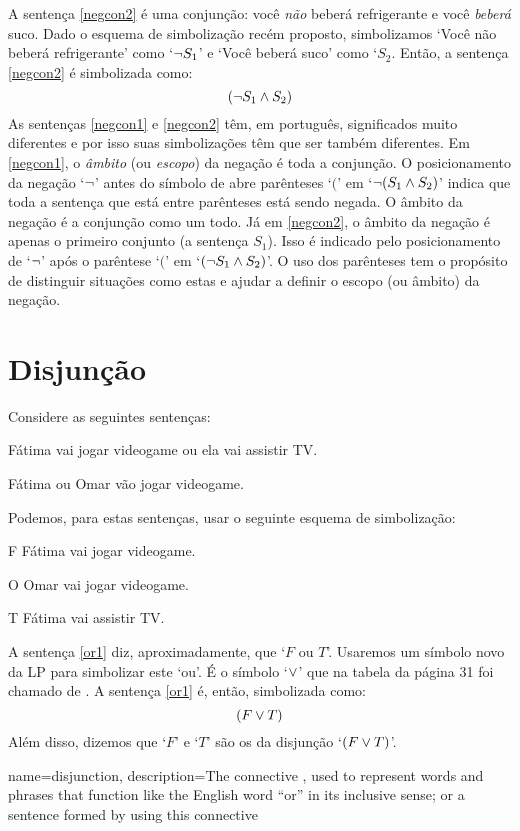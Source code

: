 A sentença \ref{negcon2} é uma conjunção:
você \emph{não} beberá refrigerante e você \emph{beberá} suco.
Dado o esquema de simbolização recém proposto, simbolizamos `Você não beberá refrigerante' como `$\neg S_1$' e `Você beberá suco' como `$S_2$.
Então, a sentença \ref{negcon2} é simbolizada como:
$$(\neg S_1 \wedge S_2)$$
As sentenças \ref{negcon1} e \ref{negcon2} têm, em português, significados muito diferentes e por isso suas simbolizações têm que ser também diferentes.
Em \ref{negcon1}, o \emph{âmbito} (ou \emph{escopo}) da negação é toda a conjunção.
O posicionamento da negação `$\neg$' antes do símbolo de abre parênteses `$($'  em `$\neg(S_1 \wedge S_2)$' indica que toda a sentença que está entre parênteses está sendo negada. O âmbito da negação é a conjunção como um todo.
Já em \ref{negcon2}, o âmbito da negação é apenas o primeiro conjunto (a sentença $S_1$).
Isso é indicado pelo posicionamento de `$\neg$' após o parêntese `$($' em `$(\neg S_1 \wedge S_2)$'.
O uso dos parênteses tem o propósito de distinguir situações como estas e ajudar a definir o escopo (ou âmbito) da negação.


\section{Disjunção}

Considere as seguintes sentenças:
	\begin{earg}
		\item[\ex{or1}]Fátima vai jogar videogame ou ela vai assistir TV.
		\item[\ex{or2}]Fátima ou Omar vão jogar videogame. 
	\end{earg}
Podemos, para estas sentenças, usar o seguinte esquema de simbolização:
	\begin{ekey}
		\item[F] Fátima vai jogar videogame.
		\item[O] Omar vai jogar videogame.
		\item[T] Fátima vai assistir TV.
	\end{ekey}
A sentença \ref{or1} diz, aproximadamente, que `$F$ ou $T$'.
Usaremos um símbolo novo da LP para simbolizar este `ou'.
É o símbolo `$\vee$' que na tabela da página 31 foi chamado de . 
A sentença \ref{or1} é, então, simbolizada como:
$$(F \vee T)$$
Além disso, dizemos que `$F$' e `$T$' são os  da disjunção `$(F \vee T)$'.

{
name=disjunction,
description={The connective \eor, used to represent words and phrases that function like the English word ``or'' in its inclusive sense; or a sentence formed by using this connective}
}

